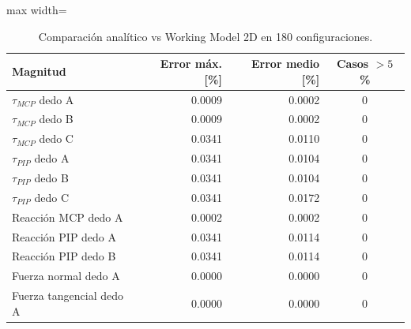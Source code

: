 \begin{table}[H]
\centering

\begin{adjustbox}{max width=\textwidth}
\begin{tabular}{|l|r|r|c|}
\hline
\textbf{Magnitud} & \textbf{Error máx. [\%]} & \textbf{Error medio [\%]} & \textbf{Casos $>5$ \%} \\ \hline
$\tau_{MCP}$ dedo A & 0.0009 & 0.0002 & 0 \\ \hline
$\tau_{MCP}$ dedo B & 0.0009 & 0.0002 & 0 \\ \hline
$\tau_{MCP}$ dedo C & 0.0341 & 0.0110 & 0 \\ \hline
$\tau_{PIP}$ dedo A & 0.0341 & 0.0104 & 0 \\ \hline
$\tau_{PIP}$ dedo B & 0.0341 & 0.0104 & 0 \\ \hline
$\tau_{PIP}$ dedo C & 0.0341 & 0.0172 & 0 \\ \hline
Reacción MCP dedo A & 0.0002 & 0.0002 & 0 \\ \hline
Reacción PIP dedo A & 0.0341 & 0.0114 & 0 \\ \hline
Reacción PIP dedo B & 0.0341 & 0.0114 & 0 \\ \hline
Fuerza normal dedo A & 0.0000 & 0.0000 & 0 \\ \hline
Fuerza tangencial dedo A & 0.0000 & 0.0000 & 0 \\ \hline
\end{tabular}
\end{adjustbox}
\caption{Comparación analítico vs Working Model 2D en 180 configuraciones.}
\label{tab:wm}
\end{table}